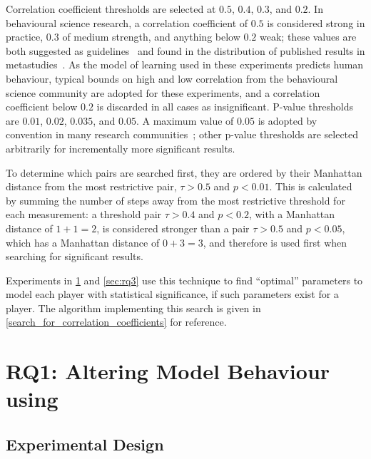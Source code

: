 \label{statistical_significance_thresholds_justified}
Correlation coefficient thresholds are selected at $0.5$, $0.4$, $0.3$, and
$0.2$. In behavioural science research, a correlation coefficient of $0.5$ is
considered strong in practice, $0.3$ of medium strength, and anything below
$0.2$ weak; these values are both suggested as
guidelines~\cite{significant_values_for_correlation_statistics} and found in the
distribution of published results in
metastudies~\cite{interpreting_correlation_coefficient_magnitude_psychology}. As
the model of learning used in these experiments predicts human behaviour,
typical bounds on high and low correlation from the behavioural science
community are adopted for these experiments, and a correlation coefficient below
$0.2$ is discarded in all cases as insignificant. P-value thresholds are $0.01$,
$0.02$, $0.035$, and $0.05$. A maximum value of $0.05$ is adopted by convention
in many research communities~\cite{borderline-significance-statistics-medicine};
other p-value thresholds are selected arbitrarily for incrementally more significant
results.

To determine which pairs are searched first, they are ordered by their Manhattan
distance from the most restrictive pair, $\tau{} > 0.5$ and $p < 0.01$. This is
calculated by summing the number of steps away from the most restrictive
threshold for each measurement: a threshold pair $\tau{} > 0.4$ and $p < 0.2$,
with a Manhattan distance of $1 + 1 = 2$, is considered stronger than a pair
$\tau{} > 0.5$ and $p < 0.05$, which has a Manhattan distance of $0 + 3 = 3$,
and therefore is used first when searching for significant results.

Experiments in \cref{sec:rq2} and \cref{sec:rq3} use this technique to find
``optimal'' parameters to model each player with statistical significance, if
such parameters exist for a player. The algorithm implementing this search is
given in \cref{search_for_correlation_coefficients} for reference.



\section{RQ1: Altering Model Behaviour using \AspectOrientation}
\label{sec:rq2}

\subsection{Experimental Design}

